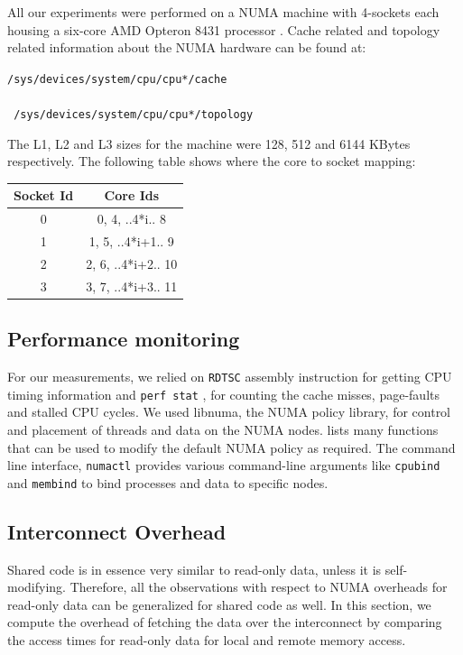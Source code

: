 
All our experiments were performed on a NUMA machine with 4-sockets each housing a six-core AMD Opteron 8431 processor \cite{opteron}.
Cache related and topology related information about the NUMA hardware can be found at:

\texttt{/sys/devices/system/cpu/cpu*/cache } \\
\\
\texttt{ /sys/devices/system/cpu/cpu*/topology }

The L1, L2 and L3 sizes for the machine were 128, 512 and 6144 KBytes respectively. The following table shows where the
core to socket mapping:

\begin{center}
\begin{tabular}{c|c}
\hline
Socket Id & Core Ids\\
\hline
0 & 0, 4, ..4*i.. 8\\ 
1 & 1, 5, ..4*i+1.. 9 \\
2 & 2, 6, ..4*i+2.. 10\\
3 & 3, 7, ..4*i+3.. 11\\
\hline
\end{tabular}
\end{center}


\subsection{Performance monitoring}
For our measurements, we relied on \texttt{RDTSC} assembly instruction\cite{timeStampCounter} for getting CPU timing information
and \texttt{perf stat} \cite{perfWiki}, for counting the cache misses, page-faults and stalled CPU cycles. We used libnuma,
the NUMA policy library, for control and placement of threads and data on the NUMA nodes. \cite{libNuma} lists many functions
that can be used to modify the default NUMA policy as required. The command line interface, \texttt{numactl} \cite{numactl} 
provides various command-line arguments like \texttt{cpubind} and \texttt{membind} to bind processes and data to specific nodes.

\subsection{Interconnect Overhead}
Shared code is in essence very similar to read-only data, unless it is self-modifying.
Therefore, all the observations with respect to NUMA overheads for read-only data can be generalized for shared code as well.
In this section, we compute the overhead of fetching the data over the interconnect by comparing the access times for read-only
data for local and remote memory access.

